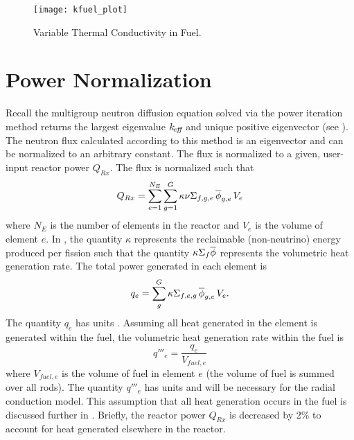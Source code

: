   \begin{figure}
    \centering
    \texttt{[image: kfuel\_plot]}
    \caption{Variable Thermal Conductivity in Fuel.}
    \label{fig:kfuel_plot}
  \end{figure}

\section{Power Normalization}
  Recall the multigroup neutron diffusion equation solved via the power
  iteration method returns the largest eigenvalue $k_{\!\mbox{\scriptsize \em eff}}$ and unique positive
  eigenvector (see ). The neutron flux calculated
  according to this method is an eigenvector and can be normalized to an
  arbitrary constant. The flux is normalized to a given, user-input reactor
  power $Q_{Rx}$. The flux is normalized such that
  \begin{equation}
    \label{eq:normalization_phi}
    Q_{Rx} = \sum_{e=1}^{N_E} \sum_{g=1}^G \kappa \nu \Sigma_{f,g,e} \, 
      \overline{\phi}_{g,e} \, V_e
  \end{equation}
  where $N_E$ is the number of elements in the reactor and $V_e$ is the volume
  of element $e$. In , the quantity $\kappa$
  represents the reclaimable (non-neutrino) energy produced per fission such
  that the quantity $\kappa \Sigma_f \overline{\phi}$ represents the volumetric heat
  generation rate.
  The total power generated in each element is 
  \begin{equation}
    \label{eq:elementpwr}
    q_{e} = \sum_g^G \kappa \Sigma_{f,e,g} \, \overline{\phi}_{g,e} \, V_e .
  \end{equation}
  The quantity $q_e$ has units . Assuming all heat generated in the
  element is generated within the fuel, the volumetric heat generation rate 
  within the fuel is 
  \begin{equation}
    \label{eq:elementqppp_fuel}
    q'''_{e} = \frac{q_e}{V_{fuel,e}}
  \end{equation}
  where $V_{fuel,e}$ is the volume of fuel in element $e$ (the volume of fuel is
  summed over all rods). The quantity $q'''_e$ has units
   and will be necessary for the radial
  conduction model. This assumption that all heat generation occurs in the fuel
  is discussed further in . Briefly, the
  reactor power $Q_{Rx}$ is decreased by 2\% to account for heat generated
  elsewhere in the reactor. 

